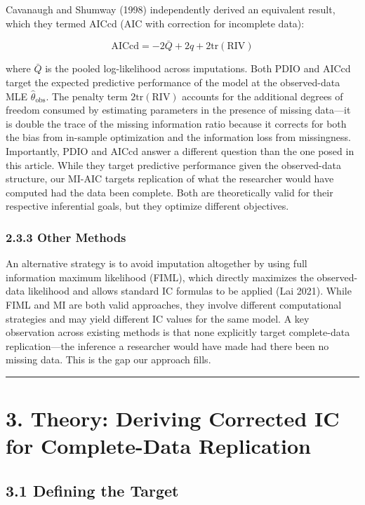 \documentclass[
]{article}
\begin{document}
Cavanaugh and Shumway (1998) independently derived an equivalent result,
which they termed AICcd (AIC with correction for incomplete data):

\[\text{AICcd} = -2\bar{Q} + 2q + 2\text{tr}(\text{RIV})\]

where \(\bar{Q}\) is the pooled log-likelihood across imputations. Both
PDIO and AICcd target the expected predictive performance of the model
at the observed-data MLE \(\hat{\theta}_{\text{obs}}\). The penalty term
\(2\text{tr}(\text{RIV})\) accounts for the additional degrees of
freedom consumed by estimating parameters in the presence of missing
data---it is double the trace of the missing information ratio because
it corrects for both the bias from in-sample optimization and the
information loss from missingness. Importantly, PDIO and AICcd answer a
different question than the one posed in this article. While they target
predictive performance given the observed-data structure, our MI-AIC
targets replication of what the researcher would have computed had the
data been complete. Both are theoretically valid for their respective
inferential goals, but they optimize different objectives.

\subsubsection{2.3.3 Other Methods}\label{other-methods}

An alternative strategy is to avoid imputation altogether by using full
information maximum likelihood (FIML), which directly maximizes the
observed-data likelihood and allows standard IC formulas to be applied
(Lai 2021). While FIML and MI are both valid approaches, they involve
different computational strategies and may yield different IC values for
the same model. A key observation across existing methods is that none
explicitly target complete-data replication---the inference a researcher
would have made had there been no missing data. This is the gap our
approach fills.

\begin{center}\rule{0.5\linewidth}{0.5pt}\end{center}

\section{3. Theory: Deriving Corrected IC for Complete-Data
Replication}\label{sec-theory}

\subsection{3.1 Defining the Target}\label{defining-the-target}
\end{document}
